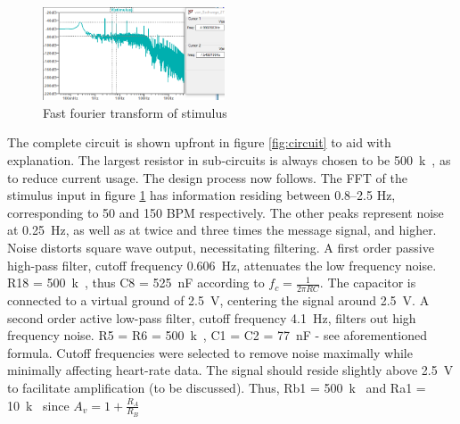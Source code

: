 \begin{figure}
	\vspace{-0.4cm}
    \centering
    \includegraphics[width = 0.48\textwidth]{./Figures/fft}
    \caption{Fast fourier transform of stimulus}
    \label{fig:fft}
\end{figure}
The complete circuit is shown upfront in figure \ref{fig:circuit} to aid with explanation. The largest resistor in sub-circuits is always chosen to be \SI{500}{k\Omega}, as to reduce current usage. The design process now follows. The FFT of the stimulus input in figure \ref{fig:fft} has information residing between \numrange{0.8}{2.5} \si{Hz}, corresponding to 50 and 150 BPM respectively. The other peaks represent noise at \SI{0.25}{Hz}, as well as at twice and three times the message signal, and higher. Noise distorts square wave output, necessitating filtering. A first order passive high-pass filter, cutoff frequency \SI{0.606}{Hz}, attenuates the low frequency noise. R18 = \SI{500}{k\Omega}, thus C8 = \SI{525}{nF} according to $f_{c} = \frac{1}{2\pi R C}$. The capacitor is connected to a virtual ground of \SI{2.5}{V}, centering the signal around \SI{2.5}{V}. A second order active low-pass filter, cutoff frequency \SI{4.1}{Hz}, filters out high frequency noise. R5 = R6 = \SI{500}{k\Omega}, C1 = C2 = \SI{77}{nF} - see aforementioned formula. Cutoff frequencies were selected to remove noise maximally while minimally affecting heart-rate data. The signal should reside slightly above \SI{2.5}{V} to facilitate amplification (to be discussed). Thus, Rb1 = \SI{500}{k\Omega} and Ra1 = \SI{10}{k\Omega} since $A_v=1+\frac{R_{A}}{R_{B}}$ 
